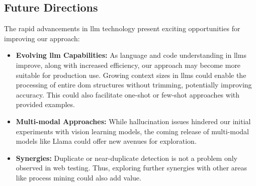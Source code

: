     \subsection{Future Directions}
        The rapid advancements in \ac{llm} technology present exciting opportunities for improving our approach:
        \begin{itemize}
            \item \textbf{Evolving \ac{llm} Capabilities:} As language and code understanding in \acp{llm} improve, along with increased efficiency, our approach may become more suitable for production use. Growing context sizes in \acp{llm} could enable the processing of entire \ac{dom} structures without trimming, potentially improving accuracy. This could also facilitate one-shot or few-shot approaches with provided examples.
            
            \item \textbf{Multi-modal Approaches:} While hallucination issues hindered our initial experiments with vision learning models, the coming release of multi-modal models like Llama could offer new avenues for exploration.

            \item \textbf{Synergies:} Duplicate or near-duplicate detection is not a problem only observed in web testing. Thus, exploring further synergies with other areas like process mining could also add value. 
        \end{itemize}
